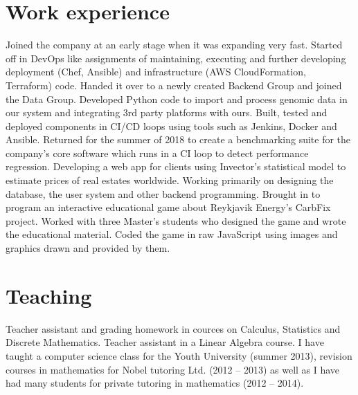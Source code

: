 \documentclass[11pt,a4paper,sans]{moderncv}
\begin{document}
\section{Work experience}
{Joined the company at an early stage when it was expanding very fast.
Started off in DevOps like assignments of maintaining, executing and
further developing deployment (Chef, Ansible) and infrastructure (AWS
CloudFormation, Terraform) code. Handed it over to a newly created Backend
Group and joined the Data Group. Developed Python code to import and process
genomic data in our system and integrating 3rd party platforms with ours.
Built, tested and deployed components in CI/CD loops using tools such as
Jenkins, Docker and Ansible. Returned for the summer of 2018 to create a
benchmarking suite for the company's core software which runs in a CI loop to
detect performance regression.}
{Developing a web app for clients using Invector's statistical model to estimate 
prices of real estates worldwide. Working primarily on designing the database, 
the user system and other backend programming.}
{Brought in to program an interactive educational game about Reykjavik Energy's
CarbFix project. Worked with three Master's students who designed the game and
wrote the educational material. Coded the game in raw JavaScript using images
and graphics drawn and provided by them.}

\section{Teaching}
{Teacher assistant and grading homework in cources on Calculus, Statistics
and Discrete Mathematics.}
{Teacher assistant in a Linear Algebra course.}
{I have taught a computer science class for the Youth University
(summer 2013), revision courses in mathematics for Nobel tutoring Ltd.
(2012 -- 2013) as well as I have had many students for private tutoring
in mathematics (2012 -- 2014).}
\end{document}
